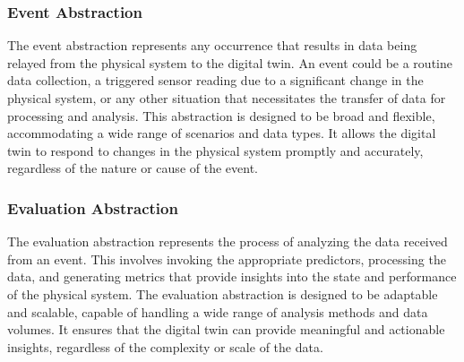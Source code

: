 \subsubsection{Event Abstraction}


The \gls{event} abstraction represents any occurrence that results in data being relayed from the physical system to the digital twin. An \gls{event} could be a routine data collection, a triggered sensor reading due to a significant change in the physical system, or any other situation that necessitates the transfer of data for processing and analysis.
%
This abstraction is designed to be broad and flexible, accommodating a wide range of scenarios and data types.
It allows the digital twin to respond to changes in the physical system promptly and accurately, regardless of the nature or cause of the \gls{event}.


\subsubsection{Evaluation Abstraction}

The \gls{evaluation} abstraction represents the process of analyzing the data received from an \gls{event}. This involves invoking the appropriate \glspl{predictor}, processing the data, and generating metrics that provide insights into the state and performance of the physical system.
%
The \gls{evaluation} abstraction is designed to be adaptable and scalable, capable of handling a wide range of analysis methods and data volumes. 
It ensures that the digital twin can provide meaningful and actionable insights, regardless of the complexity or scale of the data.

